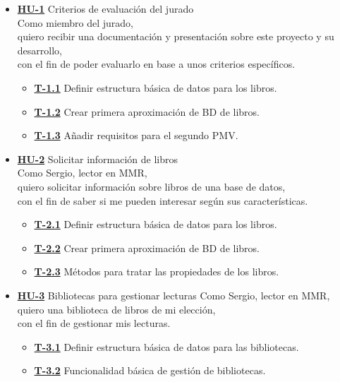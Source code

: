 \begin{itemize}
    \item \href{https://github.com/Anglepi/My-Many-Reads/issues/7}{\textbf{HU-1}} Criterios de evaluación del jurado \\
    Como miembro del jurado, \\
    quiero recibir una documentación y presentación sobre este proyecto y su desarrollo, \\
    con el fin de poder evaluarlo en base a unos criterios específicos.
    \begin{itemize}
        \item \href{https://github.com/Anglepi/My-Many-Reads/issues/15}{\textbf{T-1.1}} Definir estructura básica de datos para los libros.
        \item \href{https://github.com/Anglepi/My-Many-Reads/issues/36}{\textbf{T-1.2}} Crear primera aproximación de BD de libros.
        \item \href{https://github.com/Anglepi/My-Many-Reads/issues/37}{\textbf{T-1.3}} Añadir requisitos para el segundo PMV.
    \end{itemize}
    \item \href{https://github.com/Anglepi/My-Many-Reads/issues/29}{\textbf{HU-2}} Solicitar información de libros \\
    Como Sergio, lector en MMR, \\
    quiero solicitar información sobre libros de una base de datos, \\
    con el fin de saber si me pueden interesar según sus características.
    \begin{itemize}
        \item \href{https://github.com/Anglepi/My-Many-Reads/issues/31}{\textbf{T-2.1}} Definir estructura básica de datos para los libros.
        \item \href{https://github.com/Anglepi/My-Many-Reads/issues/32}{\textbf{T-2.2}} Crear primera aproximación de BD de libros.
        \item \href{https://github.com/Anglepi/My-Many-Reads/issues/33}{\textbf{T-2.3}} Métodos para tratar las propiedades de los libros.
    \end{itemize}
    \item \href{https://github.com/Anglepi/My-Many-Reads/issues/30}{\textbf{HU-3}} Bibliotecas para gestionar lecturas
    Como Sergio, lector en MMR, \\
    quiero una biblioteca de libros de mi elección, \\
    con el fin de gestionar mis lecturas.
    \begin{itemize}
        \item \href{https://github.com/Anglepi/My-Many-Reads/issues/34}{\textbf{T-3.1}} Definir estructura básica de datos para las bibliotecas.
        \item \href{https://github.com/Anglepi/My-Many-Reads/issues/35}{\textbf{T-3.2}} Funcionalidad básica de gestión de bibliotecas.
    \end{itemize}
\end{itemize}

